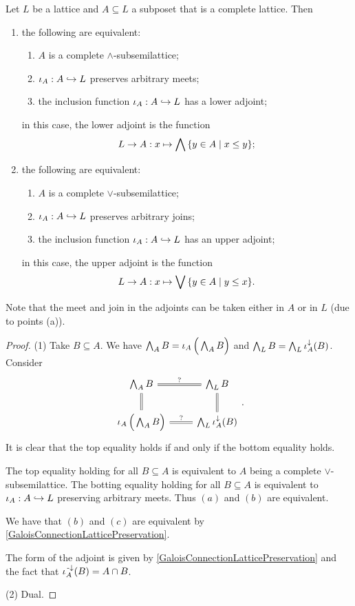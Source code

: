 \begin{lemma} \label{completeSubsemilattices}
Let $L$ be a lattice and $A\subseteq L$ a subposet that is a complete lattice. Then
\begin{enumerate}
\item the following are equivalent:
\begin{enumerate}
\item $A$ is a complete $\wedge$-subsemilattice;
\item $\operatorname{\iota}_A: A\hookrightarrow L$ preserves arbitrary meets;
\item the inclusion function $\operatorname{\iota}_A: A\hookrightarrow L$ has a lower adjoint;
\end{enumerate}
in this case, the lower adjoint is the function
\[ L \to A: x \mapsto \bigwedge \setbuilder{y\in A}{x\leq y}; \]
\item the following are equivalent:
\begin{enumerate}
\item $A$ is a complete $\vee$-subsemilattice;
\item $\operatorname{\iota}_A: A\hookrightarrow L$ preserves arbitrary joins;
\item the inclusion function $\operatorname{\iota}_A: A\hookrightarrow L$ has an upper adjoint;
\end{enumerate}
in this case, the upper adjoint is the function
\[ L \to A: x \mapsto \bigvee \setbuilder{y\in A}{y\leq x}. \]
\end{enumerate}
\end{lemma}
Note that the meet and join in the adjoints can be taken either in $A$ or in $L$ (due to points (a)).
\begin{proof}
(1) Take $B\subseteq A$. We have $\bigwedge_A B = \operatorname{\iota}_A\Big(\bigwedge_A B\Big)$ and $\bigwedge_L B = \bigwedge_L \operatorname{\iota}_A^{\downarrow}(B)$. Consider
\[ \begin{tikzcd}
\bigwedge_A B \ar[r, equal, "{?}"] \ar[d, equal] & \bigwedge_L B \ar[d, equal] \\
\incl_A\Big(\bigwedge_A B\Big) \ar[r, equal, "{?}"] & \bigwedge_L \incl_A^{\imf}(B)
\end{tikzcd}. \]
It is clear that the top equality holds if and only if the bottom equality holds.

The top equality holding for all $B\subseteq A$ is equivalent to $A$ being a complete $\vee$-subsemilattice. The botting equality holding for all $B\subseteq A$ is equivalent to $\operatorname{\iota}_A: A\hookrightarrow L$ preserving arbitrary meets. Thus $(a)$ and $(b)$ are equivalent.

We have that $(b)$ and $(c)$ are equivalent by \ref{GaloisConnectionLatticePreservation}.


The form of the adjoint is given by \ref{GaloisConnectionLatticePreservation} and the fact that $\operatorname{\iota}_A^{\text{\hspace{0.15em}-}\downarrow}(B) = A\cap B$.

(2) Dual.
\end{proof}


